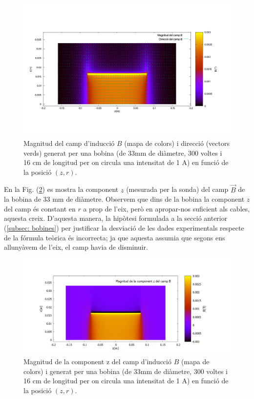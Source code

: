 \documentclass[11pt]{article}
\numberwithin{equation}{section}
\numberwithin{figure}{section}
\numberwithin{table}{section}
\begin{document}
\begin{figure}[H]
    \centering
    \includegraphics[width=0.75\linewidth]{res.png}
    \caption{Magnitud del camp d'inducció $B$ (mapa de colors) i direcció (vectors verds) generat per una bobina (de 33mm de diàmetre, 300 voltes i 16 cm de longitud per on circula una intensitat de 1 A) en funció de la posició $(z,r)$.}
    \label{fig: Bprog}
\end{figure}

En la Fig. (\ref{fig: zcomp}) es mostra la component $z$ (mesurada per la sonda) del camp $\vec{B}$ de la bobina de 33 mm de diàmetre. Observem que dins de la bobina la component $z$ del camp és constant en $r$ a prop de l'eix, però en apropar-nos suficient als cables, aquesta creix. D'aquesta manera, la hipòtesi formulada a la secció anterior (\ref{subsec: bobines}) per justificar la desviació de les dades experimentals respecte de la fórmula teòrica és incorrecta; ja que aquesta assumia que segons ens allunyàvem de l'eix, el camp havia de disminuir.

\begin{figure}[H]
    \centering
    \includegraphics[width=0.75\linewidth]{zcomp.PNG}
    \caption{Magnitud de la component z del camp d'inducció $B$ (mapa de colors) i generat per una bobina (de 33mm de diàmetre, 300 voltes i 16 cm de longitud per on circula una intensitat de 1 A) en funció de la posició $(z,r)$.}
    \label{fig: zcomp}
\end{figure}
\end{document}
